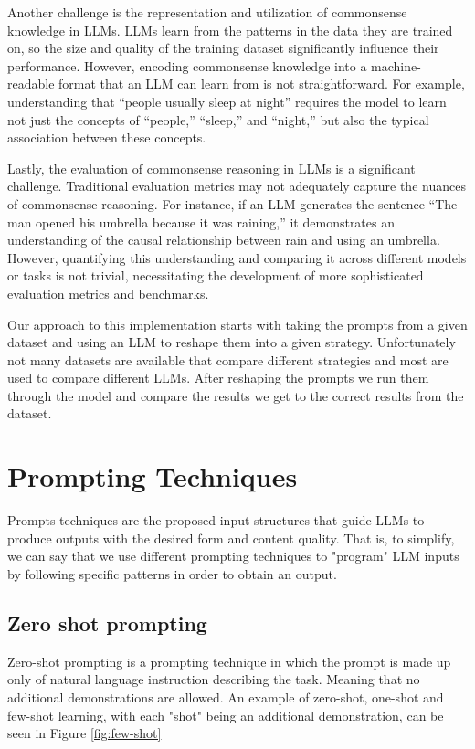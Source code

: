 \documentclass[fleqn,moreauthors,10pt]{ds_report}
\begin{document}
Another challenge is the representation and utilization of commonsense knowledge in LLMs. LLMs learn from the patterns in the data they are trained on, so the size and quality of the training dataset significantly influence their performance. However, encoding commonsense knowledge into a machine-readable format that an LLM can learn from is not straightforward. For example, understanding that “people usually sleep at night” requires the model to learn not just the concepts of “people,” “sleep,” and “night,” but also the typical association between these concepts.

Lastly, the evaluation of commonsense reasoning in LLMs is a significant challenge. Traditional evaluation metrics may not adequately capture the nuances of commonsense reasoning. For instance, if an LLM generates the sentence “The man opened his umbrella because it was raining,” it demonstrates an understanding of the causal relationship between rain and using an umbrella. However, quantifying this understanding and comparing it across different models or tasks is not trivial, necessitating the development of more sophisticated evaluation metrics and benchmarks.

Our approach to this implementation starts with taking the prompts from a given dataset and using an LLM to reshape them into a given strategy. Unfortunately not many datasets are available that compare different strategies and most are used to compare different LLMs. After reshaping the prompts we run them through the model and compare the results we get to the correct results from the dataset.

\section*{Prompting Techniques}

Prompts techniques are the proposed input structures that guide LLMs to produce outputs with the desired form and content quality. That is, to simplify, we can say that we use different prompting techniques to "program" LLM inputs by following specific patterns in order to obtain an output. \cite{prompttechniques}

\subsection*{Zero shot prompting}
Zero-shot prompting \cite{Few-shot} is a prompting technique in which the prompt is made up only of natural language instruction describing the task. Meaning that no additional demonstrations are allowed. An example of zero-shot, one-shot and few-shot learning, with each "shot" being an additional demonstration, can be seen in Figure \ref{fig:few-shot} 
\end{document}
